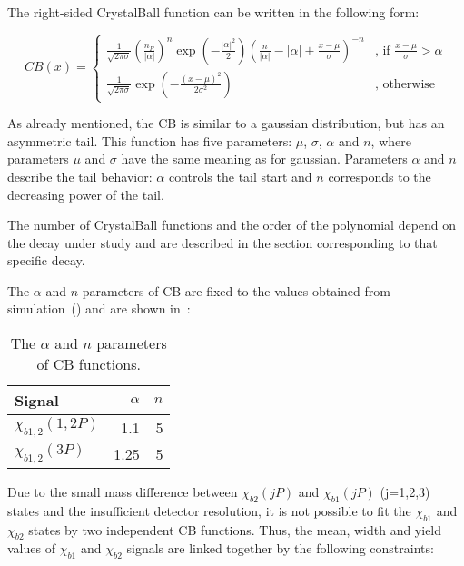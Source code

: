 The right-sided CrystalBall function can be written in the following form:

\begin{equation}
CB(x) = 
\begin{cases}
\frac{1}{\sqrt{2\pi\sigma}}{(\frac{n_R}{|\alpha|})}^{n}\exp(-\frac{|\alpha|^2}{2}){(\frac{n}{|\alpha|}-|\alpha|+\frac{x-\mu}{\sigma})}^{-n} & \text{, if $\frac{x-\mu}{\sigma} > \alpha$}\\
\frac{1}{\sqrt{2\pi\sigma}}\exp(-\frac{{(x-\mu)}^2}{2\sigma^2}) & \text{, otherwise}
\end{cases}
\label{eq:cb}
\end{equation}




As already mentioned, the CB is similar to a gaussian distribution, but has an asymmetric tail. This
function has five parameters: $\mu$, $\sigma$, $\alpha$ and $n$, where
parameters $\mu$ and $\sigma$ have the same meaning as for gaussian. Parameters
$\alpha$ and $n$ describe the tail behavior: $\alpha$ controls the tail start
and $n$ corresponds to the decreasing power of the tail. 

The number of CrystalBall functions and the order of the polynomial depend on
the decay under study and are described in the section corresponding to that
specific decay.


The $\alpha$ and $n$
parameters of CB are fixed to the values obtained from simulation~()
and are shown in~:


\begin{table}[H]
\caption{\small   The $\alpha$ and $n$ parameters of CB functions.}
\centering
\begin{tabular}{lrr}
\toprule
Signal & $\alpha$ & $n$ \\
\midrule
$\chi_{b1,2}(1,2P)$ & 1.1 & 5 \\
$\chi_{b1,2}(3P)$ & 1.25 & 5 \\
\bottomrule
\end{tabular}
\label{tab:chib:fit:tail}
\end{table}

Due to the small mass difference between $\chi_{b2}(jP)$ and $\chi_{b1}(jP)$
(j=1,2,3) states and the insufficient detector resolution, it is not possible
to fit the $\chi_{b1}$ and $\chi_{b2}$ states by two independent CB functions.
Thus, the mean, width and yield values of  $\chi_{b1}$ and $\chi_{b2}$ signals
are linked together by the following constraints:

